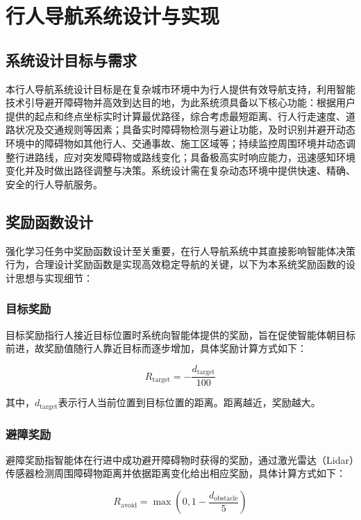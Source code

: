 \chapter{行人导航系统设计与实现}

\section{系统设计目标与需求}

本行人导航系统设计目标是在复杂城市环境中为行人提供有效导航支持，利用智能技术引导避开障碍物并高效到达目的地，为此系统须具备以下核心功能：根据用户提供的起点和终点坐标实时计算最优路径，综合考虑最短距离、行人行走速度、道路状况及交通规则等因素；具备实时障碍物检测与避让功能，及时识别并避开动态环境中的障碍物如其他行人、交通事故、施工区域等；持续监控周围环境并动态调整行进路线，应对突发障碍物或路线变化；具备极高实时响应能力，迅速感知环境变化并及时做出路径调整与决策。系统设计需在复杂动态环境中提供快速、精确、安全的行人导航服务。

\section{奖励函数设计}

强化学习任务中奖励函数设计至关重要，在行人导航系统中其直接影响智能体决策行为，合理设计奖励函数是实现高效稳定导航的关键，以下为本系统奖励函数的设计思想与实现细节：

\subsection{目标奖励}
目标奖励指行人接近目标位置时系统向智能体提供的奖励，旨在促使智能体朝目标前进，故奖励值随行人靠近目标而逐步增加，具体奖励计算方式如下：

\begin{equation}
R_{\text{target}} = - \frac{d_{\text{target}}}{100}
\end{equation}

其中，$d_{\text{target}}$表示行人当前位置到目标位置的距离。距离越近，奖励越大。

\subsection{避障奖励}
避障奖励指智能体在行进中成功避开障碍物时获得的奖励，通过激光雷达（Lidar）传感器检测周围障碍物距离并依据距离变化给出相应奖励，具体计算方式如下：

\begin{equation}
R_{\text{avoid}} = \max \left(0, 1 - \frac{d_{\text{obstacle}}}{5} \right)
\end{equation}

